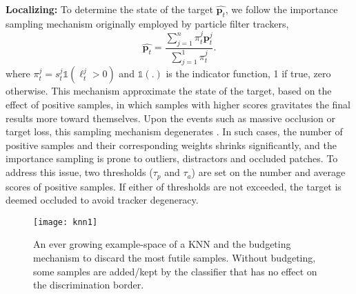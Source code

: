 \documentclass[conference,twoside]{IEEEtran}
\begin{document}
\textbf{Localizing:} To determine the state of the target $\hat{\mathbf{p}_t}$, we follow the importance sampling mechanism originally employed by particle filter trackers, 
\begin{equation}
\hat{\mathbf{p}_t} = \frac{\sum_{j=1}^n \pi_t^j \mathbf{p}_t^j}{\sum_{j=1}^1 \pi_t^j}.
\label{eq:approx}
\end{equation}
where $\pi^j_t = s^j_t \mathds{1}(\ell^j_t > 0)$ and $\mathds{1}(.)$ is the indicator function, 1 if true, zero otherwise.
This mechanism approximate the state of the target, based on the effect of positive samples, in which samples with higher scores gravitates the final results more toward themselves. Upon the events such as massive occlusion or target loss, this sampling mechanism degenerates \cite{bao2012real}. In such cases, the number of positive samples and their corresponding weights shrinks significantly, and the importance sampling is prone to outliers, distractors and occluded patches. To address this issue, two thresholds ($\tau_p$ and $\tau_a$) are set on the number and average scores of positive samples. If either of thresholds are not exceeded, the target is deemed occluded to avoid tracker degeneracy. 

\begin{figure}[!t]
\centering
\texttt{[image: knn1]}
\caption{An ever growing example-space of a KNN and the budgeting mechanism to discard the most futile samples. Without budgeting, some samples are added/kept by the classifier that has no effect on the discrimination border. }
\label{fig:knn_budget}
\vspace{-0.7 cm}
\end{figure}
\end{document}
